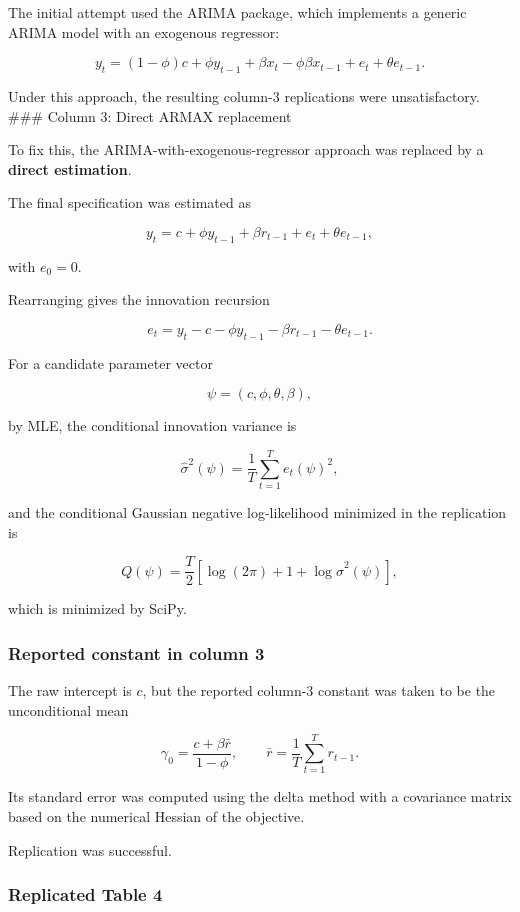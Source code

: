 \documentclass[11pt]{article}
\begin{document}
The initial attempt used the ARIMA package, which implements a generic
ARIMA model with an exogenous regressor:

\[
y_t
=
(1-\phi)c
+ \phi y_{t-1}
+ \beta x_t
- \phi \beta x_{t-1}
+ e_t + \theta e_{t-1}.
\]

Under this approach, the resulting column-3 replications were
unsatisfactory. \#\#\# Column 3: Direct ARMAX replacement

To fix this, the ARIMA-with-exogenous-regressor approach was replaced by
a \textbf{direct estimation}.

The final specification was estimated as

\[
y_t = c + \phi y_{t-1} + \beta r_{t-1} + e_t + \theta e_{t-1},
\]

with \(e_0=0\).

Rearranging gives the innovation recursion

\[
e_t = y_t - c - \phi y_{t-1} - \beta r_{t-1} - \theta e_{t-1}.
\]

For a candidate parameter vector

\[
\psi = (c,\phi,\theta,\beta),
\]

by MLE, the conditional innovation variance is

\[
\hat{\sigma}^2(\psi) = \frac{1}{T}\sum_{t=1}^T e_t(\psi)^2,
\]

and the conditional Gaussian negative log-likelihood minimized in the
replication is

\[
Q(\psi)
=
\frac{T}{2}
\left[
\log(2\pi)+1+\log \hat{\sigma}^2(\psi)
\right],
\]

which is minimized by SciPy.

\subsubsection{Reported constant in column
3}\label{reported-constant-in-column-3}

The raw intercept is \(c\), but the reported column-3 constant was taken
to be the unconditional mean

\[
\gamma_0
=
\frac{c+\beta \bar r}{1-\phi},
\qquad
\bar r = \frac{1}{T}\sum_{t=1}^T r_{t-1}.
\]

Its standard error was computed using the delta method with a covariance
matrix based on the numerical Hessian of the objective.

Replication was successful.

\subsubsection{Replicated Table 4}\label{replicated-table-4}
\end{document}
